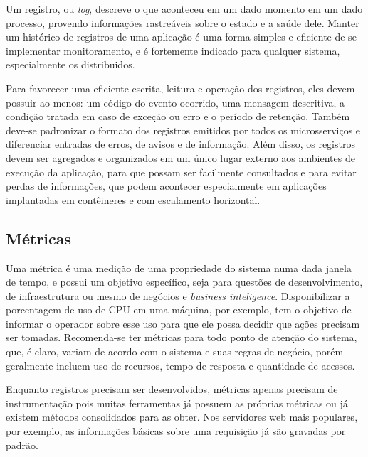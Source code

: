 Um registro, ou \emph{log}, descreve o que aconteceu em um dado momento em um dado processo, provendo informações rastreáveis sobre o estado e a saúde dele. Manter um histórico de registros de uma aplicação é uma forma simples e eficiente de se implementar monitoramento, e é fortemente indicado para qualquer sistema, especialmente os distribuidos. 

Para favorecer uma eficiente escrita, leitura e operação dos registros, eles devem possuir ao menos: um código do evento ocorrido, uma mensagem descritiva, a condição tratada em caso de exceção ou erro e o período de retenção. Também deve-se padronizar o formato dos registros emitidos por todos os microsserviços e diferenciar entradas de erros, de avisos e de informação. Além disso, os registros devem ser agregados e organizados em um único lugar externo aos ambientes de execução da aplicação, para que possam ser facilmente consultados e para evitar perdas de informações, que podem acontecer especialmente em aplicações implantadas em contêineres e com escalamento horizontal. \cite{livro-sre-google-workbook}



\subsection{Métricas}
Uma métrica é uma medição de uma propriedade do sistema numa dada janela de tempo, e possui um objetivo específico, seja para questões de desenvolvimento, de infraestrutura ou mesmo de negócios e \emph{business inteligence}. Disponibilizar a porcentagem de uso de CPU em uma máquina, por exemplo, tem o objetivo de informar o operador sobre esse uso para que ele possa decidir que ações precisam ser tomadas. Recomenda-se ter métricas para todo ponto de atenção do sistema, que, é claro, variam de acordo com o sistema e suas regras de negócio, porém geralmente incluem uso de recursos, tempo de resposta e quantidade de acessos.

Enquanto registros precisam ser desenvolvidos, métricas apenas precisam de instrumentação pois muitas ferramentas já possuem as próprias métricas ou já existem métodos consolidados para as obter. Nos servidores web mais populares, por exemplo, as informações básicas sobre uma requisição já são gravadas por padrão.

